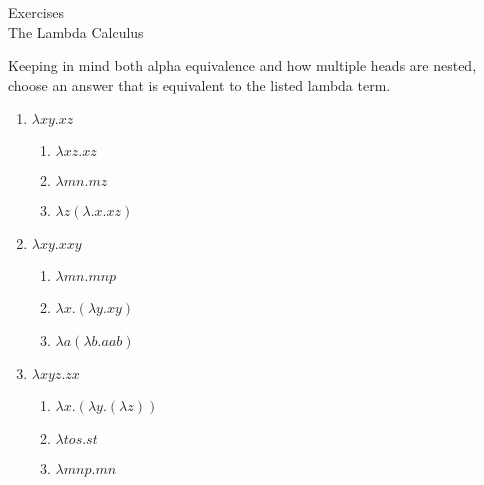 \documentclass{article}
\newcommand\ExTitle{The Lambda Calculus}
\newcommand\fullExTitle{Exercises \\ \ExTitle }
\begin{document}
\begin{Huge}
	\begin{center}
	\fullExTitle
	\end{center}
\end{Huge}
\begin{Exercise}
Keeping in mind both alpha equivalence and how multiple heads are nested, choose an answer that is equivalent to the listed lambda term.
\begin{enumerate}
\item 
$\lambda xy.xz$
\begin{enumerate}
  \item 
  $\lambda xz.xz$
  \item
  $\lambda mn.mz$
  \item
  $\lambda z (\lambda.x.xz)$
  \end{enumerate}
  \item
  $\lambda xy.xxy$
  \begin{enumerate}
  \item 
  $\lambda mn.mnp$
   \item 
  $\lambda x.(\lambda y .xy)$
   \item 
  $\lambda a(\lambda b. aab)$
  \end{enumerate}
  \item
   $\lambda xyz. zx$
 \begin{enumerate}
  \item 
     $\lambda x.(\lambda y.(\lambda  z))$
   \item 
     $\lambda tos.st$
       \item 
     $\lambda mnp.mn$
  \end{enumerate}
   \end{enumerate}
 \end{Exercise}
\end{document}
